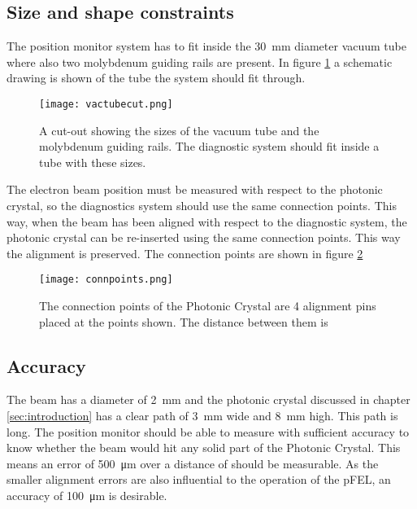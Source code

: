 \subsection{Size and shape constraints}
The position monitor system has to fit inside the \SI{30}{\milli\meter} diameter vacuum tube where also two molybdenum guiding rails are present. In figure \ref{fig:vacuumtube} a schematic drawing is shown of the tube the system should fit through.
\begin{figure}[h]
 \centering
 \texttt{[image: vactubecut.png]}
 \caption{A cut-out showing the sizes of the vacuum tube and the molybdenum guiding rails. The diagnostic system should fit inside a tube with these sizes.}
 \label{fig:vacuumtube}
\end{figure}
The electron beam position must be measured with respect to the photonic crystal, so the diagnostics system should use the same connection points. This way, when the beam has been aligned with respect to the diagnostic system, the photonic crystal can be re-inserted using the same connection points. This way the alignment is preserved. The connection points are shown in figure \ref{fig:connpoints}
\begin{figure}[H]
 \centering
 \texttt{[image: connpoints.png]}
 \caption{The connection points of the Photonic Crystal are 4 alignment pins placed at the points shown. The distance between them is }
 \label{fig:connpoints}
\end{figure}

\subsection{Accuracy}
The beam has a diameter of \SI{2}{\milli\meter} and the photonic crystal discussed in chapter \ref{sec:introduction} has a clear path of \SI{3}{\milli\meter} wide and \SI{8}{\milli\meter} high. This path is  long. The position monitor should be able to measure with sufficient accuracy to know whether the beam would hit any solid part of the Photonic Crystal. This means an error of \SI{500}{\micro\meter} over a distance of  should be measurable. As the smaller alignment errors are also influential to the operation of the pFEL,  an accuracy of \SI{100}{\micro\meter} is desirable.

